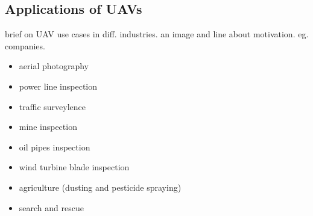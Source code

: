 \subsection{Applications of UAVs}
brief on UAV use cases in diff. industries. an image and line about motivation. eg. companies.
\begin{itemize}
    \item aerial photography
    \item power line inspection
    \item traffic surveylence
    \item mine inspection
    \item oil pipes inspection
    \item wind turbine blade inspection
    \item agriculture (dusting and pesticide spraying)
    \item search and rescue
\end{itemize}


